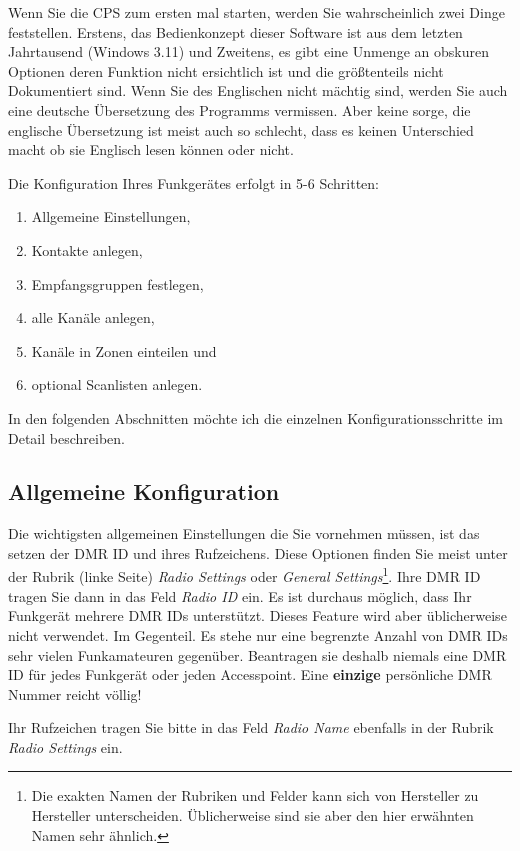 Wenn Sie die CPS zum ersten mal starten, werden Sie wahrscheinlich zwei Dinge feststellen. Erstens, das Bedienkonzept dieser Software ist aus dem letzten Jahrtausend (Windows 3.11) und Zweitens, es gibt eine Unmenge an obskuren Optionen deren Funktion nicht ersichtlich ist und die größtenteils nicht Dokumentiert sind. Wenn Sie des Englischen nicht mächtig sind, werden Sie auch eine deutsche Übersetzung des Programms vermissen. Aber keine sorge, die englische Übersetzung ist meist auch so schlecht, dass es keinen Unterschied macht ob sie Englisch lesen können oder nicht.

Die Konfiguration Ihres Funkgerätes erfolgt in 5-6 Schritten:
\begin{enumerate}
 \item Allgemeine Einstellungen,
 \item Kontakte anlegen,
 \item Empfangsgruppen festlegen,
 \item alle Kanäle anlegen,
 \item Kanäle in Zonen einteilen und
 \item optional Scanlisten anlegen.
\end{enumerate}

In den folgenden Abschnitten möchte ich die einzelnen Konfigurationsschritte im Detail beschreiben.

\subsection{Allgemeine Konfiguration} \label{sec:cp:basic}
Die wichtigsten allgemeinen Einstellungen die Sie vornehmen müssen, ist das setzen der DMR ID und ihres Rufzeichens. Diese Optionen finden Sie meist unter der Rubrik (linke Seite) \emph{Radio Settings} oder \emph{General Settings}\footnote{Die exakten Namen der Rubriken und Felder kann sich von Hersteller zu Hersteller unterscheiden. Üblicherweise sind sie aber den hier erwähnten Namen sehr ähnlich.}. Ihre DMR ID tragen Sie dann in das Feld \emph{Radio ID} ein. Es ist durchaus möglich, dass Ihr Funkgerät mehrere DMR IDs unterstützt. Dieses Feature wird aber üblicherweise nicht verwendet. Im Gegenteil. Es stehe nur eine begrenzte Anzahl von DMR IDs sehr vielen Funkamateuren gegenüber. Beantragen sie deshalb niemals eine DMR ID für jedes Funkgerät oder jeden Accesspoint. Eine \textbf{einzige} persönliche DMR Nummer reicht völlig! 

Ihr Rufzeichen tragen Sie bitte in das Feld \emph{Radio Name} ebenfalls in der Rubrik \emph{Radio Settings} ein.  


